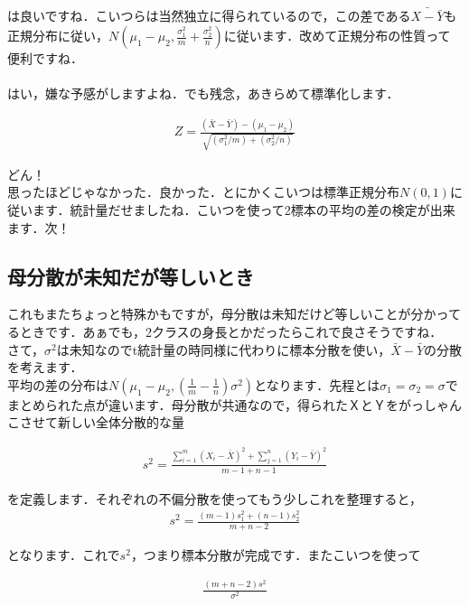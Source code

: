 \documentclass[11pt,a4paper,uplatex]{ujreport} 	%
\begin{document}
は良いですね．こいつらは当然独立に得られているので，この差である$\bar{X-\bar{Y}}$も正規分布に従い，$N(\mu_1 - \mu_2, \frac{\sigma_1^2}{m} + \frac{\sigma_2^2}{n})$に従います．改めて正規分布の性質って便利ですね．\\
\\

はい，嫌な予感がしますよね．でも残念，あきらめて標準化します．

\begin{align}
  Z = \frac{(\bar{X} - \bar{Y})-(\mu_1-\mu_2)}{\sqrt{(\sigma_1^2/m)+(\sigma_2^2/n)}}
  \label{eq:z2}
\end{align}

どん！\\

思ったほどじゃなかった．良かった．とにかくこいつは標準正規分布$N(0,1)$に従います．統計量だせましたね．こいつを使って2標本の平均の差の検定が出来ます．次！



\subsection{母分散が未知だが等しいとき}
これもまたちょっと特殊かもですが，母分散は未知だけど等しいことが分かってるときです．あぁでも，2クラスの身長とかだったらこれで良さそうですね．\\

さて，$\sigma^2$は未知なのでt統計量の時同様に代わりに標本分散を使い，$\bar{X}- \bar{Y}$の分散を考えます．\\

平均の差の分布は$N(\mu_1 -\mu_2, (\frac{1}{m} - \frac{1}{n})\sigma^2)$となります．先程とは$\sigma_1=\sigma_2=\sigma$でまとめられた点が違います．母分散が共通なので，得られたＸとＹをがっしゃんこさせて新しい全体分散的な量

\begin{align}
  s^2 = \frac{\sum_{i=1}^m (X_i-\bar{X})^2 + \sum_{j=1}^n (Y_i - \bar{Y})^2}{m-1 + n-1}
  \label{eq:combined-s}
\end{align}

を定義します．それぞれの不偏分散を使ってもう少しこれを整理すると，
\begin{align}
  s^2 = \frac{(m-1)s_1^2 + (n-1)s_2^2}{m+n-2}
  \label{eq:combined-s2}
\end{align}

となります．これで$s^2$，つまり標本分散が完成です．またこいつを使って

\begin{align}
  \frac{(m+n-2)s^2}{\sigma^2}
  \label{eq:chi}
\end{align}
\end{document}

